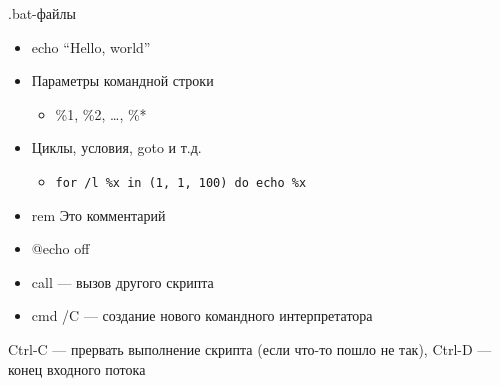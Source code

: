 \documentclass{../../slides-style}
\begin{document}
    \begin{frame}[fragile]{.bat-файлы}
        \begin{itemize}
            \item echo ``Hello, world''
            \item Параметры командной строки
            \begin{itemize}
                \item  \%1, \%2, …, \%*
            \end{itemize}
            \item Циклы, условия, goto и т.д.
            \begin{itemize}
                \item 
                    \begin{footnotesize}
                        \begin{verbatim}
for /l %x in (1, 1, 100) do echo %x
                        \end{verbatim}
                    \end{footnotesize}
            \end{itemize}
            \item rem Это комментарий
            \item @echo off
            \item call --- вызов другого скрипта
            \item cmd /C --- создание нового командного интерпретатора
        \end{itemize}
        Ctrl-C --- прервать выполнение скрипта (если что-то пошло не так), Ctrl-D --- конец входного потока
    \end{frame}
\end{document}
